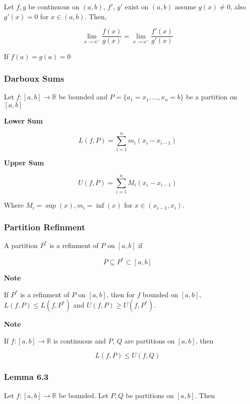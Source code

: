 \documentclass[12pt,letterpaper]{article}
\newcommand{\R}{{\mathbb R}}
\begin{document}
\begin{multicols*}{2}
        Let $f, g$ be continuous on $(a, b)$, $f'$, $g'$ exist on $(a, b)$
        assume $g(x) \ne 0$, also $g'(x) = 0$ for $x \in (a, b)$. Then,

        \[
          \lim_{x \to a^+} \frac{f(x)}{g(x)} = \lim_{x \to a^+}
          \frac{f'(x)}{g'(x)}
        \]

        If $f(a) = g(a) = 0$

        \subsubsection{Darboux Sums}

        Let $f: [a, b] \rightarrow \R$ be bounded and $P = \{a_1 = x_1, ..., x_n
        = b\}$ be a partition on $[a, b]$

        {\bf Lower Sum}

        \[
          L(f, P) = \sum_{i = 1}^n m_i(x_i - x_{i - 1})
        \]

        {\bf Upper Sum}

        \[
          U(f, P) = \sum_{i = 1}^n M_i(x_i - x_{i - 1})
        \]

        Where $M_i = \sup(x), m_i = \inf(x)$ for $x \in (x_{i - 1}, x_i)$.


        \subsubsection{Partition Refinment}

        A partition $P^*$ is a refinment of $P$ on $[a, b]$ if

        \[
          P \subseteq P^* \subset [a, b]
        \]

        {\bf Note}

        If $P^*$ is a refinment of $P$ on $[a, b]$, then for $f$ bounded on $[a,
        b]$, $L(f, P) \le L(f, P^*)$ and $U(f, P) \ge U(f, P^*)$.

        {\bf Note}

        If $f: [a, b] \rightarrow \R$ is continuous and $P$, $Q$ are partitions
        on $[a, b]$, then

        \[
          L(f, P) \le U(f, Q)
        \]

        \subsubsection{Lemma 6.3}

        Let $f: [a, b] \rightarrow \R$ be bounded. Let $P, Q$ be partitions on
        $[a, b]$. Then


\end{multicols*}
\end{document}
